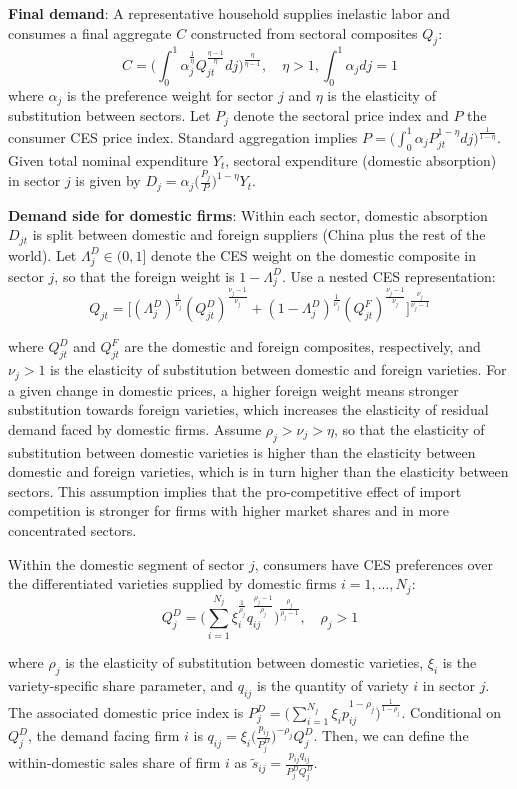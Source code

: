 \documentclass[12pt]{article}
\begin{document}
\textbf{Final demand}: A representative household supplies inelastic labor and consumes a final aggregate $C$ constructed from sectoral composites $Q_j$: 
\[C = \Bigg(\int_{0}^{1} \alpha_j^{\frac{1}{\eta}} Q_{jt}^{\frac{\eta-1}{\eta}}dj \Bigg)^{\frac{\eta}{\eta-1}}, \quad \eta > 1, \int_{0}^{1} \alpha_j dj = 1\]
where $\alpha_j$ is the preference weight for sector $j$ and $\eta$ is the elasticity of substitution between sectors. Let $P_{j}$ denote the sectoral price index and $P$ the consumer CES price index. Standard aggregation implies $P = \bigg(\int_{0}^{1} \alpha_j P_{jt}^{1-\eta} dj \bigg)^{\frac{1}{1-\eta}}$. Given total nominal expenditure $Y_t$, sectoral expenditure (domestic absorption) in sector $j$ is given by $D_{j} = \alpha_j \bigg(\frac{P_j}{P}\bigg)^{1-\eta} Y_t$. 

\textbf{Demand side for domestic firms}: Within each sector, domestic absorption $D_{jt}$ is split between domestic and foreign suppliers (China plus the rest of the world). Let $\Lambda_j^D \in (0,1]$ denote the CES weight on the domestic composite in sector $j$, so that the foreign weight is $1-\Lambda_j^D$. Use a nested CES representation:
$$Q_{jt} = \bigg[ (\Lambda_j^D)^{\frac{1}{\nu_j}} (Q_{jt}^D)^{\frac{\nu_j-1}{\nu_j}} + (1-\Lambda_j^D)^{\frac{1}{\nu_j}} (Q_{jt}^F)^{\frac{\nu_j-1}{\nu_j}} \bigg]^{\frac{\nu_j}{\nu_j-1}}$$

where $Q_{jt}^D$ and $Q_{jt}^F$ are the domestic and foreign composites, respectively, and $\nu_j > 1$ is the elasticity of substitution between domestic and foreign varieties. For a given change in domestic prices, a higher foreign weight means stronger substitution towards foreign varieties, which increases the elasticity of residual demand faced by domestic firms. Assume $\rho_j > \nu_j > \eta$, so that the elasticity of substitution between domestic varieties is higher than the elasticity between domestic and foreign varieties, which is in turn higher than the elasticity between sectors. This assumption implies that the pro-competitive effect of import competition is stronger for firms with higher market shares and in more concentrated sectors.

Within the domestic segment of sector $j$, consumers have CES preferences over the differentiated varieties supplied by domestic firms $i = 1, ..., N_j$:
\[Q_{j}^D = \Bigg(\sum_{i=1}^{N_j} \xi_i^{\frac{1}{\rho_j}} q_{ij}^{\frac{\rho_j-1}{\rho_j}} \Bigg)^{\frac{\rho_j}{\rho_j-1}}, \quad \rho_j > 1\]

where $\rho_j$ is the elasticity of substitution between domestic varieties, $\xi_i$ is the variety-specific share parameter, and $q_{ij}$ is the quantity of variety $i$ in sector $j$. The associated domestic price index is $P_j^D = \bigg(\sum_{i=1}^{N_j} \xi_i p_{ij}^{1-\rho_j} \bigg)^{\frac{1}{1-\rho_j}}$. Conditional on $Q_j^D$, the demand facing firm $i$ is $q_{ij} = \xi_i \bigg(\frac{p_{ij}}{P_j^D}\bigg)^{-\rho_j} Q_j^D$. Then, we can define the within-domestic sales share of firm $i$ as $\tilde{s}_{ij} = \frac{p_{ij} q_{ij}}{P_{j}^D Q_{j}^D}$.
\end{document}
